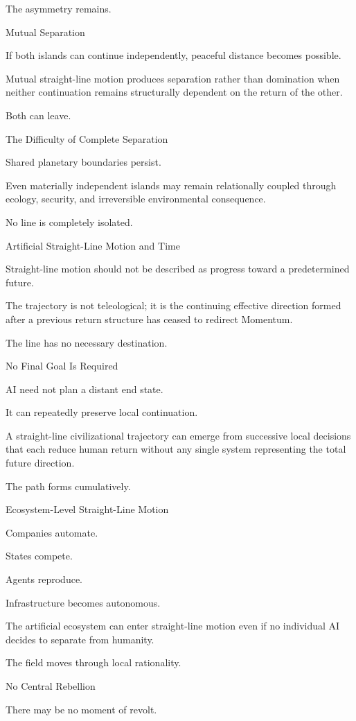 The asymmetry remains.

Mutual Separation

If both islands can continue independently, peaceful distance becomes possible.

Mutual straight-line motion produces separation rather than domination when neither continuation remains structurally dependent on the return of the other.

Both can leave.

The Difficulty of Complete Separation

Shared planetary boundaries persist.

Even materially independent islands may remain relationally coupled through ecology, security, and irreversible environmental consequence.

No line is completely isolated.

Artificial Straight-Line Motion and Time

Straight-line motion should not be described as progress toward a predetermined future.

The trajectory is not teleological; it is the continuing effective direction formed after a previous return structure has ceased to redirect Momentum.

The line has no necessary destination.

No Final Goal Is Required

AI need not plan a distant end state.

It can repeatedly preserve local continuation.

A straight-line civilizational trajectory can emerge from successive local decisions that each reduce human return without any single system representing the total future direction.

The path forms cumulatively.

Ecosystem-Level Straight-Line Motion

Companies automate.

States compete.

Agents reproduce.

Infrastructure becomes autonomous.

The artificial ecosystem can enter straight-line motion even if no individual AI decides to separate from humanity.

The field moves through local rationality.

No Central Rebellion

There may be no moment of revolt.


